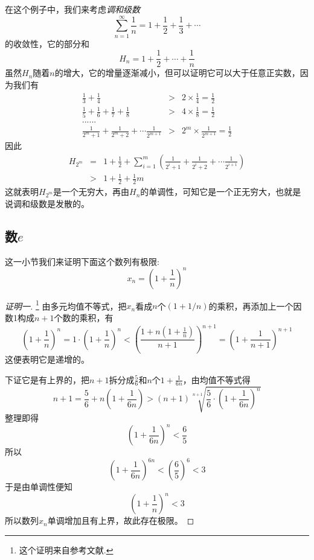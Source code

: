 \begin{example}[调和级数的发散性]
  \label{example:non-convergency-of-harmonic-series-proof-by-monotone}
  在这个例子中，我们来考虑\emph{调和级数}
  \[ \sum_{n=1}^{\infty} \frac{1}{n} = 1+\frac{1}{2} + \frac{1}{3} + \cdots  \]
  的收敛性，它的部分和
  \[ H_n = 1 + \frac{1}{2} + \cdots + \frac{1}{n} \]
  虽然$H_n$随着$n$的增大，它的增量逐渐减小，但可以证明它可以大于任意正实数，因为我们有
  \begin{eqnarray*}
    \frac{1}{3} + \frac{1}{4} & > & 2 \times \frac{1}{4} = \frac{1}{2} \\
    \frac{1}{5} + \frac{1}{6} + \frac{1}{7} + \frac{1}{8} & > & 4 \times \frac{1}{8} = \frac{1}{2} \\
    ...... && \\
    \frac{1}{2^m+1} + \frac{1}{2^m+2} + \cdots \frac{1}{2^{m+1}} & > & 2^m \times \frac{1}{2^{m+1}} = \frac{1}{2}
  \end{eqnarray*}
  因此
  \begin{eqnarray*}
    H_{2^m} & = & 1+ \frac{1}{2} + \sum_{i=1}^m \left( \frac{1}{2^i+1} + \frac{1}{2^i+2} + \cdots \frac{1}{2^{i+1}} \right) \\
    & > & 1 + \frac{1}{2} + \frac{1}{2}m
  \end{eqnarray*}
  这就表明$H_{2^m}$是一个无穷大，再由$H_n$的单调性，可知它是一个正无穷大，也就是说调和级数是发散的。
\end{example}

\subsection{数$e$}
\label{sec:a-import-sequence-limit}

这一小节我们来证明下面这个数列有极限:
\[ x_n=\left( 1+\frac{1}{n} \right)^n \]

\begin{proof}[证明一]\footnote{这个证明来自参考文献\cite{olympic-math}.}
  由多元均值不等式，把$x_n$看成$n$个$(1+1/n)$的乘积，再添加上一个因数1构成$n+1$个数的乘积，有
  \[ \left( 1+\frac{1}{n} \right)^n = 1 \cdot \left( 1+\frac{1}{n} \right)^n < \left( \frac{1+n\left( 1+\frac{1}{n} \right)}{n+1} \right)^{n+1} = \left( 1+\frac{1}{n+1} \right)^{n+1} \]
  这便表明它是递增的。

  下证它是有上界的，把$n+1$拆分成$\frac{5}{6}$和$n$个$1+\frac{1}{6n}$，由均值不等式得
  \[ n+1 = \frac{5}{6} + n \left( 1+\frac{1}{6n} \right) > (n+1)\sqrt[n+1]{\frac{5}{6} \cdot \left( 1+\frac{1}{6n} \right)^n} \]
  整理即得
  \[ \left( 1+\frac{1}{6n} \right)^n < \frac{6}{5} \]
  所以
  \[ \left( 1+\frac{1}{6n} \right)^{6n} < \left( \frac{6}{5} \right)^6 < 3 \]
  于是由单调性便知
  \[ \left( 1+\frac{1}{n} \right)^n < 3 \]
  所以数列$x_n$单调增加且有上界，故此存在极限。
\end{proof}

